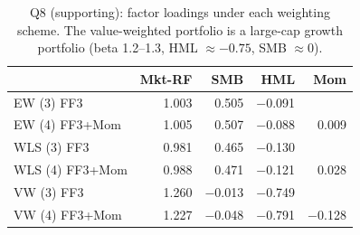 \begin{table}[!htbp]
\centering
\small
\caption{Q8 (supporting): factor loadings under each weighting scheme. The value-weighted portfolio is a large-cap growth portfolio (beta 1.2--1.3, HML $\approx -0.75$, SMB $\approx 0$).}
\label{tab:q8b}
\begin{tabular}{lrrrr}
\toprule
 & Mkt-RF & SMB & HML & Mom \\
\midrule
EW (3) FF3 & 1.003 & 0.505 & $-$0.091 &  \\
EW (4) FF3+Mom & 1.005 & 0.507 & $-$0.088 & 0.009 \\
WLS (3) FF3 & 0.981 & 0.465 & $-$0.130 &  \\
WLS (4) FF3+Mom & 0.988 & 0.471 & $-$0.121 & 0.028 \\
VW (3) FF3 & 1.260 & $-$0.013 & $-$0.749 &  \\
VW (4) FF3+Mom & 1.227 & $-$0.048 & $-$0.791 & $-$0.128 \\
\bottomrule
\end{tabular}
\end{table}
